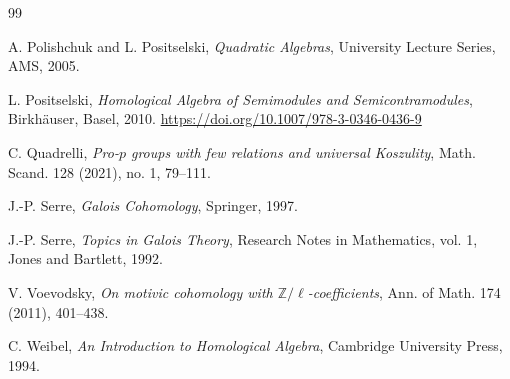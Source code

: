\documentclass[11pt]{amsart}
\numberwithin{equation}{section}
\theoremstyle{definition}
\begin{document}
\begin{thebibliography}{99}
		
		A. Polishchuk and L. Positselski,
		\emph{Quadratic Algebras},
		University Lecture Series, AMS, 2005.
		
		
		L. Positselski,
		\emph{Homological Algebra of Semimodules and Semicontramodules},
		Birkh\"auser, Basel, 2010. \url{https://doi.org/10.1007/978-3-0346-0436-9}
		
		C. Quadrelli,
		\emph{Pro-$p$ groups with few relations and universal Koszulity},
		Math. Scand. 128 (2021), no. 1, 79--111.
		
		
		J.-P. Serre,
		\emph{Galois Cohomology},
		Springer, 1997.
		
		J.-P. Serre,
		\emph{Topics in Galois Theory},
		Research Notes in Mathematics, vol. 1,
		Jones and Bartlett, 1992.
		
		
		
		
		
		
		
		
		V. Voevodsky,
		\emph{On motivic cohomology with $\mathbb{Z}/\ell$-coefficients},
		Ann. of Math. 174 (2011), 401--438.
		
		C. Weibel,
		\emph{An Introduction to Homological Algebra},
		Cambridge University Press, 1994.
		
		
	\end{thebibliography}
	
	
\end{document}
